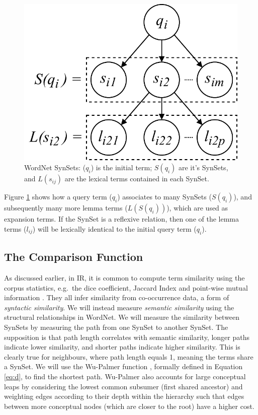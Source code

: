 \begin{figure}
    \centering
    \includegraphics[width=0.6\linewidth]{graphics/lemma_diagram.pdf} 
    \caption{WordNet SynSets: ($q_i$) is the initial term; $S(q_i)$ are it's SynSets, and $L(s_{ij})$ are the lexical terms contained in each SynSet.}
    \label{fig:wn}
\end{figure}

\noindent
Figure \ref{fig:wn} shows how a query term ($q_i$) associates to many SynSets ($S(q_i)$), and subsequently many more lemma terms ($L(S(q_i))$), which are used as expansion terms. If the SynSet is a reflexive relation, then one of the lemma terms ($l_{ij}$) will be lexically identical to the initial query term ($q_i$).


\subsection{The Comparison Function}
As discussed earlier, in IR, it is common to compute term similarity using the corpus statistics, e.g.\ the dice coefficient, Jaccard Index and point-wise mutual information \cite{Carpineto:2012:SAQ:2071389.2071390}. They all infer similarity from co-occurrence data, a form of \textit{syntactic similarity}. We will instead measure \textit{semantic similarity} using the structural relationships in WordNet. We will measure the similarity between SynSets by measuring the path from one SynSet to another SynSet. The supposition is that path length correlates with semantic similarity, longer paths indicate lower similarity, and shorter paths indicate higher similarity. This is clearly true for neighbours, where path length equals 1, meaning the terms share a SynSet. We will use the Wu-Palmer function \cite{Wu:1994:VSL:981732.981751}, formally defined in Equation \ref{eq:d}, to find the shortest path. Wu-Palmer also accounts for large conceptual leaps by considering the lowest common subsumer (first shared ancestor) and weighting edges according to their depth within the hierarchy such that edges between more conceptual nodes (which are closer to the root) have a higher cost. 

